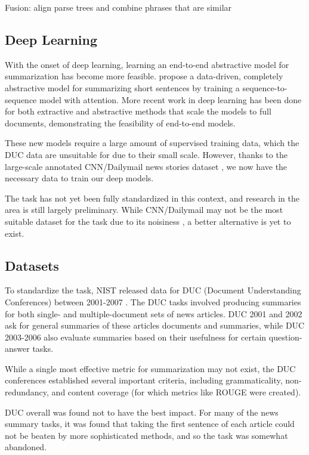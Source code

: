 \documentclass[11pt]{report}
\begin{document}
Fusion: align parse trees and combine phrases that are similar 


\subsection{Deep Learning}

With the onset of deep learning, learning an end-to-end abstractive model for summarization has become more feasible. \citet{rush2015neural} propose a data-driven, completely abstractive model for summarizing short sentences by training a sequence-to-sequence model with attention. More recent work in deep learning has been done for both extractive \citep{} %
and abstractive \citep{nallapati2016seq2seq, ramachandran2016} methods that scale the models to full documents, demonstrating the feasibility of end-to-end models.

These new models require a large amount of supervised training data, which the DUC data are unsuitable for due to their small scale. However, thanks to the large-scale annotated CNN/Dailymail news stories dataset \cite{Hermann2015}, we now have the necessary data to train our deep models.

The task has not yet been fully standardized in this context, and research in the area is still largely preliminary. While CNN/Dailymail may not be the most suitable dataset for the task due to its noisiness \citep{Chen2016}, a better alternative is yet to exist.


\subsection{Datasets}

To standardize the task, NIST released data for DUC (Document Understanding Conferences) between 2001-2007 \citep{over2007duc}. The DUC tasks involved producing summaries for both single- and multiple-document sets of news articles. DUC 2001 and 2002 ask for general summaries of these articles documents and summaries, while DUC 2003-2006 also evaluate summaries based on their usefulness for certain question-answer tasks. %

While a single most effective metric for summarization may not exist, the DUC conferences established several important criteria, including grammaticality, non-redundancy, and content coverage (for which metrics like ROUGE \citep{lin2004rouge} were created).

DUC overall was found not to have the best impact. For many of the news summary tasks, it was found that taking the first sentence of each article could not be beaten by more sophisticated methods, and so the task was somewhat abandoned.
\end{document}

